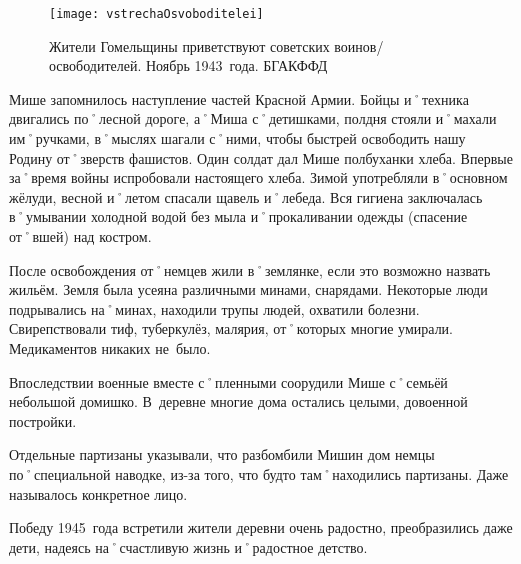 \begin{wrapfigure}{O}{.4\textwidth}
\centering
\texttt{[image: vstrechaOsvoboditelei]}
\caption{Жители Гомельщины приветствуют советских воинов\-/освободителей. Ноябрь 1943~года. БГАКФФД}
\label{fig:vstrechaOsvoboditelei}
\end{wrapfigure}

Мише запомнилось наступление частей Красной Армии. Бойцы и˚техника двигались по˚лесной дороге, а˚Миша с˚детишками, полдня стояли и˚махали им˚ручками, в˚мыслях шагали с˚ними, чтобы быстрей освободить нашу Родину от˚зверств фашистов. Один солдат дал Мише полбуханки хлеба. Впервые за˚время войны испробовали настоящего хлеба. Зимой употребляли в˚основном жёлуди, весной и˚летом спасали щавель и˚лебеда. Вся гигиена заключалась в˚умывании холодной водой без мыла и˚прокаливании одежды (спасение от˚вшей) над костром.

После освобождения от˚немцев жили в˚землянке, если это возможно назвать жильём. Земля была усеяна различными минами, снарядами. Некоторые люди подрывались на˚минах, находили трупы людей, охватили болезни. Свирепствовали тиф, туберкулёз, малярия, от˚которых многие умирали. Медикаментов никаких не~было. 

Впоследствии военные вместе с˚пленными соорудили Мише с˚семьёй небольшой домишко. В~деревне многие дома остались целыми, довоенной постройки. 

Отдельные партизаны указывали, что разбомбили Мишин дом немцы по˚специальной наводке, из-за того, что будто там˚находились партизаны. Даже называлось конкретное лицо. 

Победу 1945~года встретили жители деревни очень радостно, преобразились даже дети, надеясь на˚счастливую жизнь и˚радостное детство.